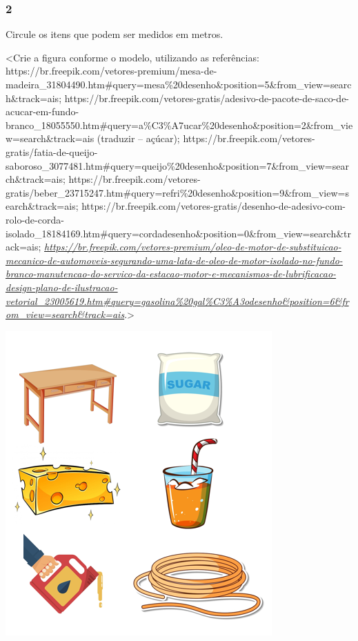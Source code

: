 \subsubsection{2}\label{section-28}

Circule os itens que podem ser medidos em metros.

\textless{}Crie a figura conforme o modelo, utilizando as referências:
https://br.freepik.com/vetores-premium/mesa-de-madeira\_31804490.htm\#query=mesa\%20desenho\&position=5\&from\_view=search\&track=ais;
https://br.freepik.com/vetores-gratis/adesivo-de-pacote-de-saco-de-acucar-em-fundo-branco\_18055550.htm\#query=a\%C3\%A7ucar\%20desenho\&position=2\&from\_view=search\&track=ais
(traduzir -- açúcar);
https://br.freepik.com/vetores-gratis/fatia-de-queijo-saboroso\_3077481.htm\#query=queijo\%20desenho\&position=7\&from\_view=search\&track=ais;
https://br.freepik.com/vetores-gratis/beber\_23715247.htm\#query=refri\%20desenho\&position=9\&from\_view=search\&track=ais;
https://br.freepik.com/vetores-gratis/desenho-de-adesivo-com-rolo-de-corda-isolado\_18184169.htm\#query=cordadesenho\&position=0\&from\_view=search\&track=ais;
\href{https://br.freepik.com/vetores-premium/oleo-de-motor-de-substituicao-mecanico-de-automoveis-segurando-uma-lata-de-oleo-de-motor-isolado-no-fundo-branco-manutencao-do-servico-da-estacao-motor-e-mecanismos-de-lubrificacao-design-plano-de-ilustracao-vetorial_23005619.htm\#query=gasolina\%20gal\%C3\%A3odesenho\&position=6\&from_view=search\&track=ais}{\emph{https://br.freepik.com/vetores-premium/oleo-de-motor-de-substituicao-mecanico-de-automoveis-segurando-uma-lata-de-oleo-de-motor-isolado-no-fundo-branco-manutencao-do-servico-da-estacao-motor-e-mecanismos-de-lubrificacao-design-plano-de-ilustracao-vetorial\_23005619.htm\#query=gasolina\%20gal\%C3\%A3odesenho\&position=6\&from\_view=search\&track=ais}}.\textgreater{}

\includegraphics[width=4.02139in,height=4.59439in]{media/image24.png}

